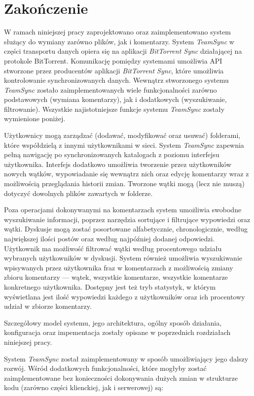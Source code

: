 \documentclass[polish,a4paper,twoside]{ppfcmthesis}
\begin{document}
\chapter{Zakończenie}

W ramach niniejszej pracy zaprojektowano oraz zaimplementowano system służący do wymiany zarówno plików, jak i komentarzy. System \emph{TeamSync} w części transportu danych opiera się na aplikacji \emph{BitTorrent Sync} działającej na protokole BitTorrent. Komunikację pomiędzy systemami umożliwia API stworzone przez producentów aplikacji \emph{BitTorrent Sync}, które umożliwia kontrolowanie synchronizowanych danych. Wewnątrz stworzonego systemu \emph{TeamSync} zostało zaimplementowanych wiele funkcjonalności zarówno podstawowych (wymiana komentarzy), jak i dodatkowych (wyszukiwanie, filtrowanie). Wszystkie najistotniejsze funkcje systemu \emph{TeamSync} zostały wymienione poniżej.

Użytkownicy mogą zarządzać (dodawać, modyfikować oraz usuwać) folderami, które współdzielą z innymi użytkownikami w sieci. System \emph{TeamSync} zapewnia pełną nawigację po synchronizowanych katalogach z poziomu interfejsu użytkownika. Interfejs dodatkowo umożliwia tworzenie przez użytkowników nowych wątków, wypowiadanie się wewnątrz nich oraz edycję komentarzy wraz z możliwością przeglądania historii zmian. Tworzone wątki mogą (lecz nie muszą) dotyczyć dowolnych plików zawartych w folderze.

Poza operacjami dokonywanymi na komentarzach system umożliwia swobodne wyszukiwanie informacji, poprzez narzędzia sortujące i filtrujące wypowiedzi oraz wątki. Dyskusje mogą zostać posortowane alfabetycznie, chronologicznie, według największej ilości postów oraz według najpóźniej dodanej odpowiedzi. Użytkownik ma możliwość filtrować wątki według procentowego udziału wybranych użytkowników w dyskusji. System również umożliwia wyszukiwanie wpisywanych przez użytkownika fraz w komentarzach z możliwością zmiany zbioru komentarzy --- wątek, wszystkie komentarze, wszystkie komentarze konkretnego użytkownika. Dostępny jest też tryb statystyk, w którym wyświetlana jest ilość wypowiedzi każdego z użytkowników oraz ich procentowy udział w zbiorze komentarzy.

Szczegółowy model systemu, jego architektura, ogólny sposób działania, konfiguracja oraz impementacja zostały opisane w poprzednich rozdziałach niniejszej pracy. 

System \emph{TeamSync} został zaimplementowany w sposób umożliwiający jego dalszy rozwój. Wśród dodatkowych funkcjonalności, które mogłyby zostać zaimplementowane bez konieczności dokonywania dużych zmian w strukturze kodu (zarówno części klienckiej, jak i serwerowej) są:
\end{document}
